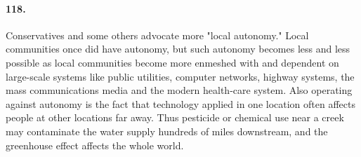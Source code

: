 \documentclass[12pt]{book}
\begin{document}
\paragraph{118.}  Conservatives and some others advocate more "local autonomy." Local communities once did have autonomy, but such autonomy becomes less and less possible as local communities become more enmeshed with and dependent on large-scale systems like public utilities, computer networks, highway systems, the mass communications media and the modern health-care system. Also operating against autonomy is the fact that technology applied in one location often affects people at other locations far away. Thus pesticide or chemical use near a creek may contaminate the water supply hundreds of miles downstream, and the greenhouse effect affects the whole world.
\end{document}
